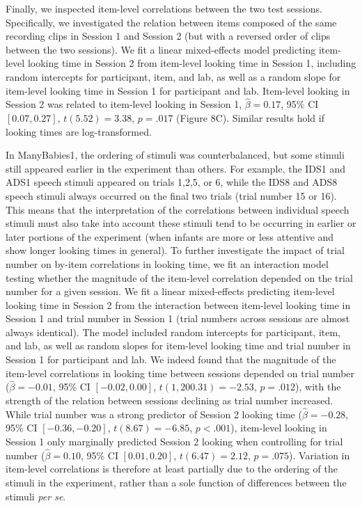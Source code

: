 \documentclass[
  man, donotrepeattitle,floatsintext]{apa6}
\begin{document}
Finally, we inspected item-level correlations between the two test sessions.
Specifically, we investigated the relation between items composed of the same recording clips in Session 1 and Session 2 (but with a reversed order of clips between the two sessions).
We fit a linear mixed-effects model predicting item-level looking time in Session 2 from item-level looking time in Session 1, including random intercepts for participant, item, and lab, as well as a random slope for item-level looking time in Session 1 for participant and lab.
Item-level looking in Session 2 was related to item-level looking in Session 1, \(\hat{\beta} = 0.17\), 95\% CI \([0.07, 0.27]\), \(t(5.52) = 3.38\), \(p = .017\) (Figure 8C).
Similar results hold if looking times are log-transformed.

In ManyBabies1, the ordering of stimuli was counterbalanced, but some stimuli still appeared earlier in the experiment than others. For example, the IDS1 and ADS1 speech stimuli appeared on trials 1,2,5, or 6, while the IDS8 and ADS8 speech stimuli always occurred on the final two trials (trial number 15 or 16). This means that the interpretation of the correlations between individual speech stimuli must also take into account these stimuli tend to be occurring in earlier or later portions of the experiment (when infants are more or less attentive and show longer looking times in general). To further investigate the impact of trial number on by-item correlations in looking time, we fit an interaction model testing whether the magnitude of the item-level correlation depended on the trial number for a given session. We fit a linear mixed-effects predicting item-level looking time in Session 2 from the interaction between item-level looking time in Session 1 and trial number in Session 1 (trial numbers across sessions are almost always identical). The model included random intercepts for participant, item, and lab, as well as random slopes for item-level looking time and trial number in Session 1 for participant and lab. We indeed found that the magnitude of the item-level correlations in looking time between sessions depended on trial number (\(\hat{\beta} = -0.01\), 95\% CI \([-0.02, 0.00]\), \(t(1,200.31) = -2.53\), \(p = .012\)), with the strength of the relation between sessions declining as trial number increased. While trial number was a strong predictor of Session 2 looking time (\(\hat{\beta} = -0.28\), 95\% CI \([-0.36, -0.20]\), \(t(8.67) = -6.85\), \(p < .001\)), item-level looking in Session 1 only marginally predicted Session 2 looking when controlling for trial number (\(\hat{\beta} = 0.10\), 95\% CI \([0.01, 0.20]\), \(t(6.47) = 2.12\), \(p = .075\)). Variation in item-level correlations is therefore at least partially due to the ordering of the stimuli in the experiment, rather than a sole function of differences between the stimuli \emph{per se}.
\end{document}

